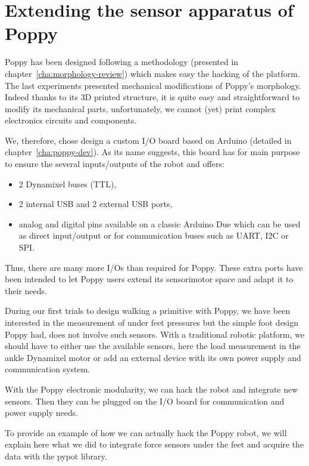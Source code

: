 
\newpage
\section{Extending the sensor apparatus of Poppy} %
\label{sec:morphology-adding-sensors}

Poppy has been designed following a methodology (presented in chapter~\ref{cha:morphology-review}) which makes easy the hacking of the platform.
The last experiments presented mechanical modifications of Poppy's morphology. Indeed thanks to its 3D printed structure, it is quite easy and straightforward to modify its mechanical parts, unfortunately, we cannot (yet) print complex electronics circuits and components.

We, therefore, chose design a custom I/O board based on Arduino (detailed in chapter~\ref{cha:poppy-dev}). As its name suggests, this board has for main purpose to ensure the several inputs/outputs of the robot and offers:
\begin{itemize}
    \item 2 Dynamixel buses (TTL),
    \item 2 internal USB and 2 external USB ports,
    \item analog and digital pins available on a classic Arduino Due which can be used as direct input/output or for communication buses such as UART, I2C or SPI.
\end{itemize}
Thus, there are many more I/Os than required for Poppy. These extra ports have been intended to let Poppy users extend its sensorimotor space and adapt it to their needs.


During our first trials to design walking a primitive with Poppy, we have been interested in the measurement of under feet pressures but the simple foot design Poppy had, does not involve such sensors. With a traditional robotic platform, we should have to either use the available sensors, here the load measurement in the ankle Dynamixel motor or add an external device with its own power supply and communication system.

With the Poppy electronic modularity, we can hack the robot and integrate new sensors. Then they can be plugged on the I/O board for communication and power supply needs.

To provide an example of how we can actually hack the Poppy robot, we will explain here what we did to integrate force sensors under the feet and acquire the data with the pypot library.


